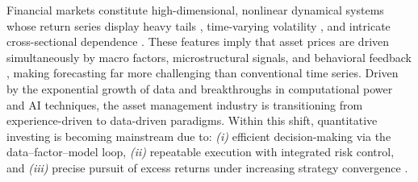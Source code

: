 \documentclass{article}
\begin{document}
Financial markets constitute high-dimensional, nonlinear dynamical systems whose return series display heavy tails \cite{mandelbrot1997variation}, time-varying volatility \cite{engle1982autoregressive}, and intricate cross-sectional dependence \cite{diebold2014network}.
These features imply that asset prices are driven simultaneously by macro factors, microstructural signals, and behavioral feedback \cite{brock1997rational, brock1998heterogeneous, kahneman2013prospect}, making forecasting far more challenging than conventional time series.
Driven by the exponential growth of data and breakthroughs in computational power and AI techniques, the asset management industry is transitioning from experience-driven to data-driven paradigms.
Within this shift, quantitative investing is becoming mainstream due to: \textit{(i)} efficient decision-making via the data–factor–model loop, \textit{(ii)} repeatable execution with integrated risk control, and \textit{(iii)} precise pursuit of excess returns under increasing strategy convergence \cite{cao2025deeplearningllmssurvey, garleanu2013dynamic}.
\end{document}

